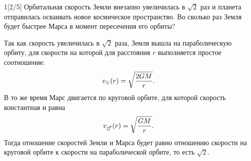 \begin{task}{1}[2/5]
    Орбитальная скорость Земли внезапно увеличилась в $\sqrt{2}$ раз и планета отправилась осваивать новое космическое пространство. Во сколько раз Земля будет быстрее Марса в момент пересечения его орбиты?
\end{task}

\begin{solution}
    Так как скорость увеличилась в $\sqrt{2}$ раза, Земля вышла на параболическую орбиту, для скорости на которой для расстояния $r$ выполняется простое соотношение:
    $$
    v_{\oplus}(r) = \sqrt{\frac{2GM}{r}}.
    $$
    В то же время Марс двигается по круговой орбите, для которой скорость константная и равна
    $$
    v_{\mars}(r) = \sqrt{\frac{GM}{r}}.
    $$
    Тогда отношение скоростей Земли и Марса будет равно отношению скорости на круговой орбите к скорости на параболической орбите, то есть $\sqrt{2}$.
    
\end{solution}
